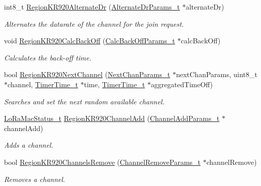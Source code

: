 \begin{DoxyCompactItemize}
int8\+\_\+t \hyperlink{group__REGIONKR920_gacebf1e0493259d52fbf28e752bf0ba55}{Region\+K\+R920\+Alternate\+Dr} (\hyperlink{group__REGION_ga001ea4338d1c83f4c785b49d7ad2d696}{Alternate\+Dr\+Params\+\_\+t} $\ast$alternate\+Dr)
\begin{DoxyCompactList}\small\item\em Alternates the datarate of the channel for the join request. \end{DoxyCompactList}\item 
void \hyperlink{group__REGIONKR920_ga4a2b24e17bcd83d8cb9166e3e4c57bb6}{Region\+K\+R920\+Calc\+Back\+Off} (\hyperlink{group__REGION_ga7c5c9a8da174e6679eded8257dc92fd9}{Calc\+Back\+Off\+Params\+\_\+t} $\ast$calc\+Back\+Off)
\begin{DoxyCompactList}\small\item\em Calculates the back-\/off time. \end{DoxyCompactList}\item 
bool \hyperlink{group__REGIONKR920_gac4409d22f60a4e0027cc22a4079637dc}{Region\+K\+R920\+Next\+Channel} (\hyperlink{group__REGION_ga115f5e83afae352c0a3dcdc193374040}{Next\+Chan\+Params\+\_\+t} $\ast$next\+Chan\+Params, uint8\+\_\+t $\ast$channel, \hyperlink{utilities_8h_a4215ca43d3e953099ea758ce428599d0}{Timer\+Time\+\_\+t} $\ast$time, \hyperlink{utilities_8h_a4215ca43d3e953099ea758ce428599d0}{Timer\+Time\+\_\+t} $\ast$aggregated\+Time\+Off)
\begin{DoxyCompactList}\small\item\em Searches and set the next random available channel. \end{DoxyCompactList}\item 
\hyperlink{group__LORAMAC_ga30bd25657e10480f8605ee951b0ecfbd}{Lo\+Ra\+Mac\+Status\+\_\+t} \hyperlink{group__REGIONKR920_gaca1aceccde474cc473e09dc3113ec876}{Region\+K\+R920\+Channel\+Add} (\hyperlink{group__REGION_gab1c5f3aa06614283202906cef4417860}{Channel\+Add\+Params\+\_\+t} $\ast$channel\+Add)
\begin{DoxyCompactList}\small\item\em Adds a channel. \end{DoxyCompactList}\item 
bool \hyperlink{group__REGIONKR920_gaada1222081dd856fe052d63f94bb78dd}{Region\+K\+R920\+Channels\+Remove} (\hyperlink{group__REGION_gaa37468560d2fc81a977b57a48e5d72c0}{Channel\+Remove\+Params\+\_\+t} $\ast$channel\+Remove)
\begin{DoxyCompactList}\small\item\em Removes a channel. \end{DoxyCompactList}\item 

\end{DoxyCompactItemize}
